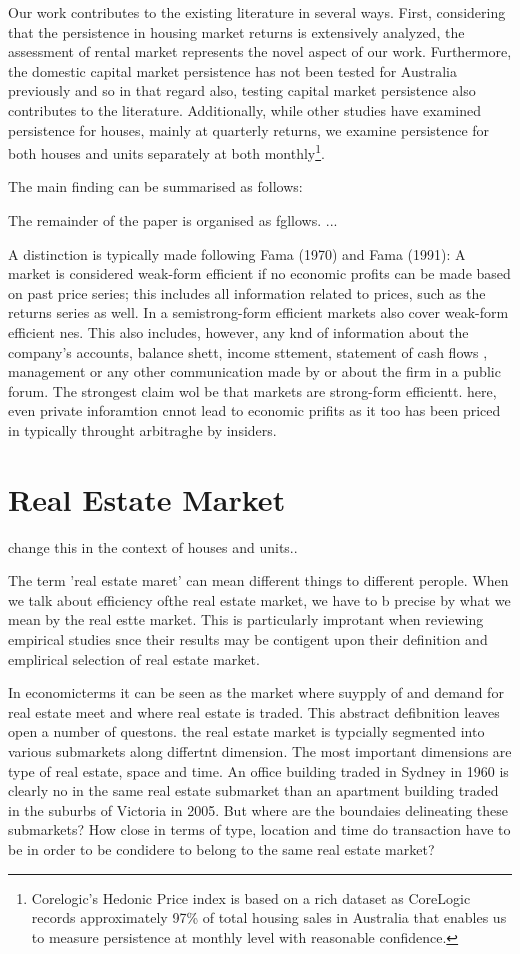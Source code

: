 \documentclass[AEJ,reqno, draftmode]{AEA}
\begin{document}
Our work contributes to the existing literature in several ways. First, considering that the persistence in housing market returns is extensively analyzed, the assessment of rental market represents the novel aspect of our work. Furthermore, the domestic capital market persistence has not been tested for Australia previously and so in that regard also, testing capital market persistence also contributes to the literature. Additionally, while other studies have examined persistence for houses, mainly at quarterly returns, we examine persistence for both houses and units separately at both monthly\footnote{Corelogic's Hedonic Price index is based on a rich dataset as CoreLogic records approximately 97\% of total housing sales in Australia that enables us to measure persistence at monthly level with reasonable confidence.}.  

The main finding can be summarised as follows: 

The remainder of the paper is organised as fgllows. ...


A distinction is typically made following Fama (1970) and Fama (1991): A market is considered weak-form efficient if no economic profits can be made based on past price series; this includes all information related to prices, such as the returns series as well. In a semistrong-form efficient markets also cover weak-form efficient nes. This also includes, however, any knd of information about the company's accounts, balance shett, income sttement, statement of cash flows , management or any other communication made by or about the firm in a public forum. The strongest claim wol be that markets are strong-form efficientt. here, even private inforamtion cnnot lead to economic prifits as it too has been priced in typically throught arbitraghe by insiders.


\section{Real Estate Market}

change this in the context of houses and units..

The term 'real estate maret' can mean different things to different perople. When we talk about efficiency ofthe real estate market, we have to b precise by what we mean by the real estte market. This is particularly improtant when reviewing empirical studies snce their results may be contigent upon their definition and emplirical selection of real estate market.

In economicterms it can be seen as the market where suypply of and demand for real estate meet and where real estate is traded. This abstract defibnition leaves open a number of questons. the real estate market is typcially segmented into various submarkets along differtnt dimension. The most important dimensions are type of real estate, space and time. An office building traded in Sydney in 1960 is clearly no in the same real estate submarket than an apartment building traded in the suburbs of Victoria in 2005. But where are the boundaies delineating these submarkets? How close in terms of type, location and time do transaction have to be in order to be condidere to belong to the same real estate market?
\end{document}
